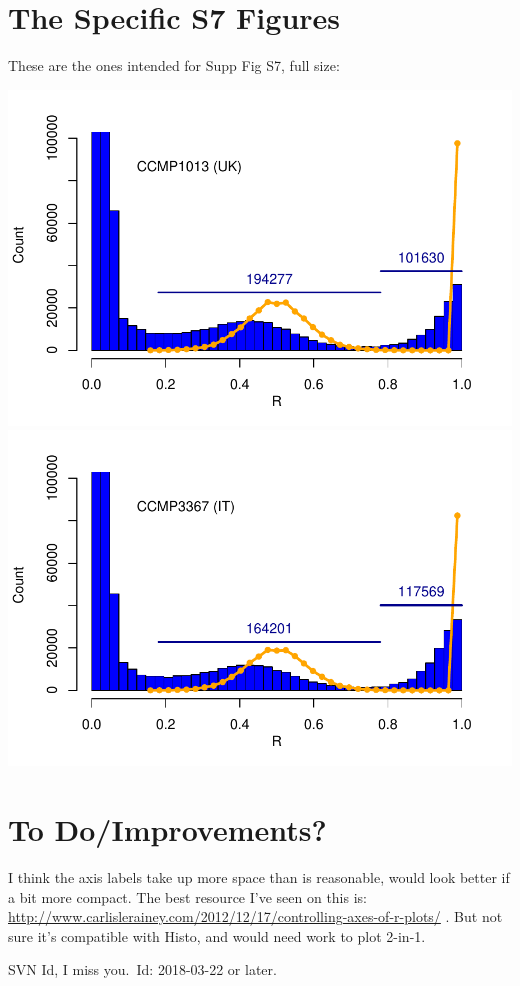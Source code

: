 \documentclass{article}\usepackage[]{graphicx}\usepackage[]{color}
\begin{document}
\section{The Specific S7 Figures}

These are the ones intended for Supp Fig S7, full size:

\noindent
\includegraphics{FigS7-hwe-histo-figs-mine/S7-full-qfiltered-1013chronly.pdf}\\
\includegraphics{FigS7-hwe-histo-figs-mine/S7-full-qfiltered-3367chronly.pdf}

\section{To Do/Improvements?}

I think the axis labels take up more space than is reasonable, would look better if a bit more 
compact.  The best resource I've seen on this is:
\href{http://www.carlislerainey.com/2012/12/17/controlling-axes-of-r-plots/}{http://www.carlislerainey.com/2012/12/17/controlling-axes-of-r-plots/} .
But not sure it's compatible with Histo, and would need work to plot 2-in-1.


\vfill\footnotesize\flushright SVN Id, I miss you.\  $ $Id: 2018-03-22 or later. $ $
\end{document}
